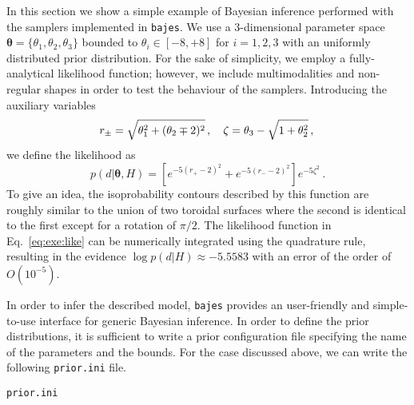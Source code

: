 \documentclass[prd,aps,twocolumn,a4paper,showkeys,nofootinbib,floatfix]{revtex4-1}
\newcommand{\be}{\begin{equation}}
\newcommand{\ee}{\end{equation}}
\def\params{\boldsymbol{\theta}}
\newcommand{\bajes}{{\tt bajes}}
\begin{document}
In this section we show a simple example of Bayesian inference 
performed with the samplers implemented in {\bajes}.
We use a 3-dimensional parameter space $\params = \{\theta_1,\theta_2,\theta_3\}$
bounded to $\theta_i\in[-8,+8]$ for $i=1,2,3$ with an uniformly distributed prior distribution.
For the sake of simplicity, we employ a fully-analytical likelihood function;
however, we include multimodalities and non-regular shapes in order to 
test the behaviour of the samplers. Introducing the auxiliary variables
\be
\label{eq:exe:r}
r_\pm = \sqrt{\theta_1^2 + (\theta_2\mp2)^2}\,,\quad
\zeta = \theta_3-\sqrt{1+\theta_2^2}\,,\\
\ee
we define the likelihood as
\be
\label{eq:exe:like}
p(d|\params,H) = \left[ e^{-5(r_+ - 2)^2} + e^{-5(r_- - 2)^2}\right] e^{-5\zeta^2}\,.
\ee
To give an idea, the isoprobability contours described by this function
are roughly similar to the union of two toroidal surfaces 
where the second is identical to the first except for a rotation of $\pi/2$.
The likelihood function in Eq.~\eqref{eq:exe:like}
can be numerically integrated using the 
quadrature rule, resulting in the evidence $\log p(d|H)\approx -5.5583$
with an error of the order of $O(10^{-5})$.

In order to infer the described model, 
{\bajes} provides an
user-friendly and simple-to-use interface for generic Bayesian inference.
In order to define the prior distributions, 
it is sufficient to write a prior configuration file
specifying the name of the parameters and the bounds.
For the case discussed above, we can write
the following {\tt prior.ini} file.
		\begin{algorithm}[H]
	\caption{{\tt prior.ini}}
	\begin{algorithmic}[1]
		\State {\tt [x1]}
		\State
		\State {\tt [x2]}
		\State
		\State {\tt [x3]}
	\end{algorithmic}
\end{algorithm}
\end{document}
